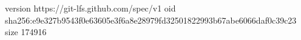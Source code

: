 version https://git-lfs.github.com/spec/v1
oid sha256:e9e327b9543f0e63605e3f6a8e28979fd32501822993b67abe6066daf0c39c23
size 174916
